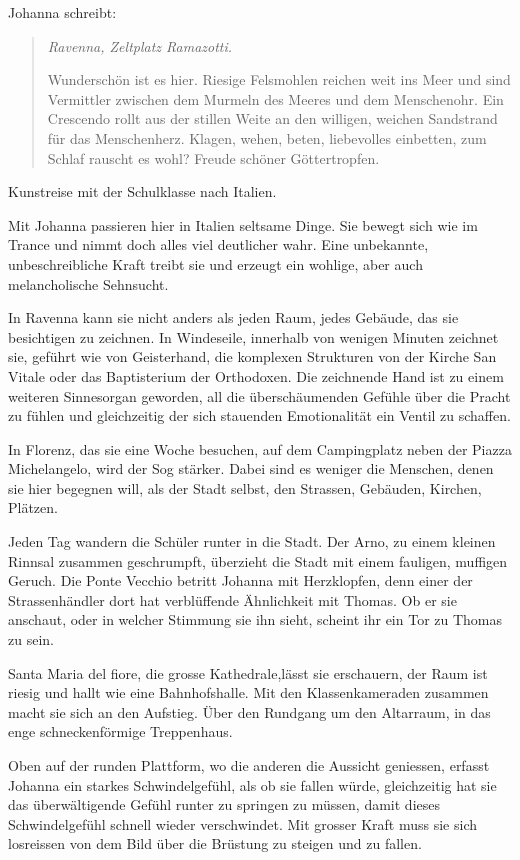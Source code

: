 \documentclass[10pt,a5paper]{book}
\newenvironment{tg}{\begin{quote}\em}{\end{quote}}
\begin{document}
Johanna schreibt:


\begin{tg}
Ravenna, Zeltplatz Ramazotti.

Wunderschön ist es hier. Riesige Felsmohlen reichen weit ins Meer und sind Vermittler zwischen dem Murmeln des Meeres und dem Menschenohr. Ein Crescendo rollt aus der stillen Weite an den willigen, weichen Sandstrand für das Menschenherz. Klagen, wehen, beten, liebevolles einbetten, zum Schlaf rauscht es wohl? Freude schöner Göttertropfen.
\end{tg}


Kunstreise mit der Schulklasse nach Italien.

Mit Johanna passieren hier in Italien seltsame Dinge. Sie bewegt sich wie im Trance und nimmt doch alles viel deutlicher wahr. Eine unbekannte, unbeschreibliche Kraft treibt sie und erzeugt ein wohlige, aber auch melancholische Sehnsucht.

In Ravenna kann sie nicht anders als jeden Raum, jedes Gebäude, das sie besichtigen zu zeichnen. In Windeseile, innerhalb von wenigen Minuten zeichnet sie, geführt wie von Geisterhand, die komplexen Strukturen von der Kirche San Vitale oder das Baptisterium der Orthodoxen. Die zeichnende Hand ist zu einem weiteren Sinnesorgan geworden, all die überschäumenden Gefühle über die Pracht zu fühlen und gleichzeitig der sich stauenden Emotionalität  ein Ventil zu schaffen.

In Florenz, das sie eine Woche besuchen, auf dem Campingplatz neben der Piazza Michelangelo, wird der Sog stärker. Dabei sind es weniger die Menschen, denen sie hier begegnen will, als der Stadt selbst, den Strassen, Gebäuden, Kirchen, Plätzen.

Jeden Tag wandern die Schüler runter in die Stadt. Der Arno, zu einem kleinen Rinnsal zusammen geschrumpft,  überzieht die Stadt mit einem fauligen, muffigen Geruch. Die Ponte Vecchio betritt Johanna mit Herzklopfen, denn einer der Strassenhändler dort hat verblüffende Ähnlichkeit mit Thomas. Ob er sie anschaut, oder in welcher Stimmung sie ihn sieht, scheint ihr ein Tor zu Thomas zu sein.

Santa Maria del fiore, die grosse Kathedrale,lässt sie erschauern, der Raum ist riesig und hallt wie eine Bahnhofshalle. Mit den Klassenkameraden zusammen macht sie sich an den Aufstieg. Über den Rundgang um den Altarraum, in das enge schneckenförmige Treppenhaus. 

Oben auf der runden Plattform, wo die anderen die Aussicht geniessen, erfasst Johanna ein starkes Schwindelgefühl, als ob sie fallen würde, gleichzeitig hat sie das überwältigende Gefühl runter zu springen zu müssen, damit dieses Schwindelgefühl schnell wieder verschwindet. Mit grosser Kraft muss sie sich losreissen von dem Bild über die Brüstung zu steigen und zu fallen. 
\end{document}
